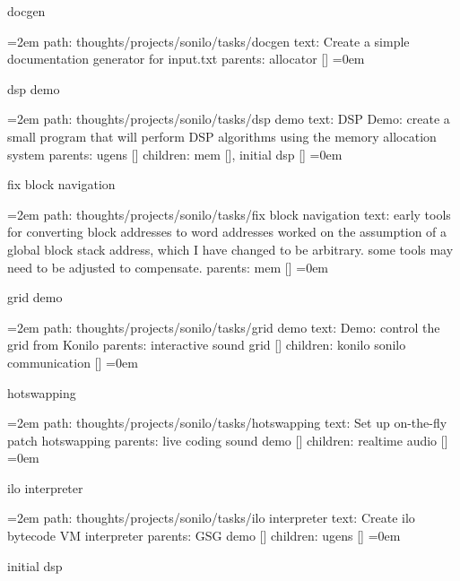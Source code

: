 docgen
\smallskip
\par\begingroup
\leftskip=2em
path: thoughts/projects/sonilo/tasks/docgen
\smallskip
text:  Create a simple documentation generator for input.txt
\smallskip
parents:  allocator []
\smallskip
\leftskip=0em
\par\endgroup
\bigskip
{}
dsp demo
\smallskip
\par\begingroup
\leftskip=2em
path: thoughts/projects/sonilo/tasks/dsp demo
\smallskip
text:  DSP Demo: create a small program that will perform DSP algorithms using the memory allocation system
\smallskip
parents:  ugens []
\smallskip
children: mem [], initial dsp []
\smallskip
\leftskip=0em
\par\endgroup
\bigskip
{}
fix block navigation
\smallskip
\par\begingroup
\leftskip=2em
path: thoughts/projects/sonilo/tasks/fix block navigation
\smallskip
text:  early tools for converting block addresses to word addresses worked on the assumption of a global block stack address, which I have changed to be arbitrary. some tools may need to be adjusted to compensate.
\smallskip
parents:  mem []
\smallskip
\leftskip=0em
\par\endgroup
\bigskip
{}
grid demo
\smallskip
\par\begingroup
\leftskip=2em
path: thoughts/projects/sonilo/tasks/grid demo
\smallskip
text:  Demo: control the grid from Konilo
\smallskip
parents:  interactive sound grid []
\smallskip
children: konilo sonilo communication []
\smallskip
\leftskip=0em
\par\endgroup
\bigskip
{}
hotswapping
\smallskip
\par\begingroup
\leftskip=2em
path: thoughts/projects/sonilo/tasks/hotswapping
\smallskip
text:  Set up on-the-fly patch hotswapping
\smallskip
parents:  live coding sound demo []
\smallskip
children: realtime audio []
\smallskip
\leftskip=0em
\par\endgroup
\bigskip
{}
ilo interpreter
\smallskip
\par\begingroup
\leftskip=2em
path: thoughts/projects/sonilo/tasks/ilo interpreter
\smallskip
text:  Create ilo bytecode VM interpreter
\smallskip
parents:  GSG demo []
\smallskip
children: ugens []
\smallskip
\leftskip=0em
\par\endgroup
\bigskip
{}
initial dsp
\smallskip
\par\begingroup
